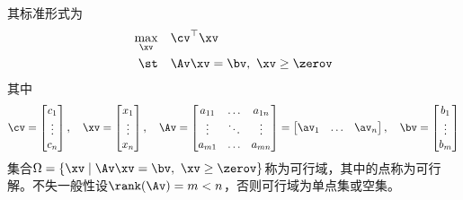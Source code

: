 \documentclass{ctexart}
\begin{document}
其标准形式为
\begin{align*}
    \max_\xv \quad & \cv^\top \xv                    \\
    \st      \quad & \Av \xv = \bv, ~ \xv \ge \zerov
\end{align*}
其中
\begin{align*}
    \cv = \begin{bmatrix}
              c_1 \\ \vdots \\ c_n
          \end{bmatrix}, \quad
    \xv = \begin{bmatrix}
              x_1 \\ \vdots \\ x_n
          \end{bmatrix}, \quad
    \Av= \begin{bmatrix}
             a_{11} & \ldots & a_{1n} \\
             \vdots & \ddots & \vdots \\
             a_{m1} & \ldots & a_{mn}
         \end{bmatrix} = \begin{bmatrix}
                             \av_1 & \ldots & \av_n
                         \end{bmatrix}, \quad
    \bv = \begin{bmatrix}
              b_1 \\ \vdots \\ b_m
          \end{bmatrix}
\end{align*}
集合$\Omega = \{\xv \mid \Av \xv = \bv, ~ \xv \ge \zerov \}$称为可行域，其中的点称为可行解。不失一般性设$\rank(\Av) = m < n$，否则可行域为单点集或空集。
\end{document}
